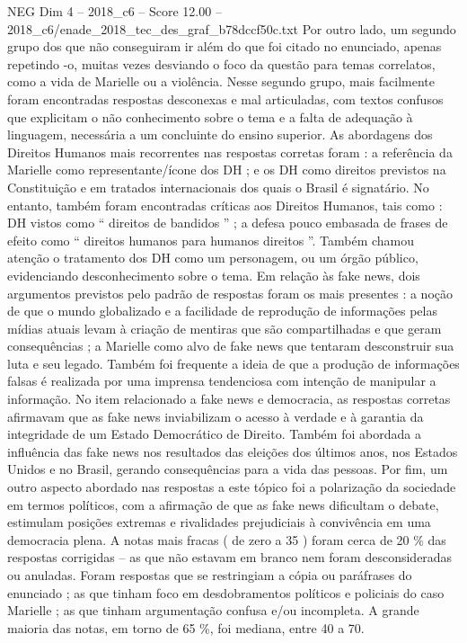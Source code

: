 \begin{textsample}{NEG Dim 4 – 2018\_c6 – Score 12.00 – 2018\_c6/enade\_2018\_tec\_des\_graf\_b78dccf50c.txt}
Por outro lado, um segundo grupo dos que não conseguiram ir além do que foi citado no enunciado, apenas repetindo -o, muitas vezes desviando o foco da questão para temas correlatos, como a vida de Marielle ou a violência.
Nesse segundo grupo, mais facilmente foram encontradas respostas desconexas e mal articuladas, com textos confusos que explicitam o não conhecimento sobre o tema e a falta de adequação à linguagem, necessária a um concluinte do ensino superior.
As abordagens dos Direitos Humanos mais recorrentes nas respostas corretas foram : a referência da Marielle como representante/ícone dos DH ; e os DH como direitos previstos na Constituição e em tratados internacionais dos quais o Brasil é signatário.
No entanto, também foram encontradas críticas aos Direitos Humanos, tais como : DH vistos como “ direitos de bandidos ” ; a defesa pouco embasada de frases de efeito como “ direitos humanos para humanos direitos ”.
Também chamou atenção o tratamento dos DH como um personagem, ou um órgão público, evidenciando desconhecimento sobre o tema.
Em relação às fake news, dois argumentos previstos pelo padrão de respostas foram os mais presentes : a noção de que o mundo globalizado e a facilidade de reprodução de informações pelas mídias atuais levam à criação de mentiras que são compartilhadas e que geram consequências ; a Marielle como alvo de fake news que tentaram desconstruir sua luta e seu legado.
Também foi frequente a ideia de que a produção de informações falsas é realizada por uma imprensa tendenciosa com intenção de manipular a informação.
No item relacionado a fake news e democracia, as respostas corretas afirmavam que as fake news inviabilizam o acesso à verdade e à garantia da integridade de um Estado Democrático de Direito.
Também foi abordada a influência das fake news nos resultados das eleições dos últimos anos, nos Estados Unidos e no Brasil, gerando consequências para a vida das pessoas.
Por fim, um outro aspecto abordado nas respostas a este tópico foi a polarização da sociedade em termos políticos, com a afirmação de que as fake news dificultam o debate, estimulam posições extremas e rivalidades prejudiciais à convivência em uma democracia plena.
A notas mais fracas ( de zero a 35 ) foram cerca de 20 \% das respostas corrigidas – as que não estavam em branco nem foram desconsideradas ou anuladas.
Foram respostas que se restringiam a cópia ou paráfrases do enunciado ; as que tinham foco em desdobramentos políticos e policiais do caso Marielle ; as que tinham argumentação confusa e/ou incompleta.
A grande maioria das notas, em torno de 65 \%, foi mediana, entre 40 a 70.

\end{textsample}
